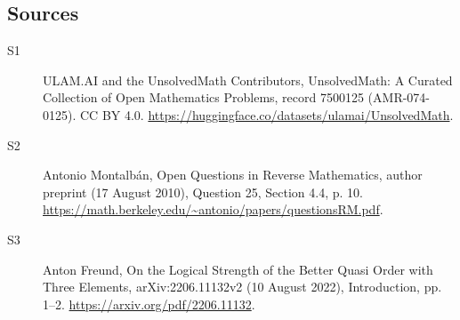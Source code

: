 \documentclass[11pt]{article}
\begin{document}
\subsection{Sources}
\begin{description}
\item[\hypertarget{source:7500125:1}{S1}] ULAM.AI and the UnsolvedMath Contributors, UnsolvedMath: A Curated Collection of Open Mathematics Problems, record 7500125 (AMR-074-0125). CC BY 4.0. \url{https://huggingface.co/datasets/ulamai/UnsolvedMath}.
\item[\hypertarget{source:7500125:2}{S2}] Antonio Montalbán, Open Questions in Reverse Mathematics, author preprint (17 August 2010), Question 25, Section 4.4, p. 10. \url{https://math.berkeley.edu/~antonio/papers/questionsRM.pdf}.
\item[\hypertarget{source:7500125:3}{S3}] Anton Freund, On the Logical Strength of the Better Quasi Order with Three Elements, arXiv:2206.11132v2 (10 August 2022), Introduction, pp. 1--2. \url{https://arxiv.org/pdf/2206.11132}.
\end{description}
\label{end:7500125}
\end{document}
